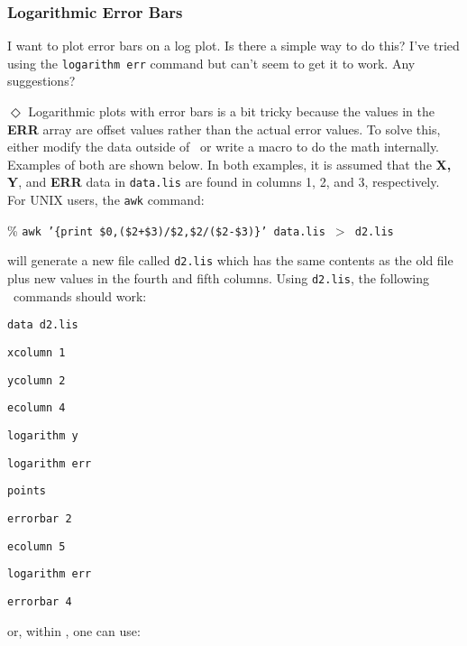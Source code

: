 \subsubsection*         {Logarithmic Error Bars}

I want to plot error bars on a log plot.
Is there a simple way to do this?
I've tried using the {\tt logarithm err} command but can't seem to get
it to work.
Any suggestions?

\indent$\Diamond$
Logarithmic plots with error bars is a bit tricky because the values in
the {\bf ERR} array are offset values rather than the actual error values.
To solve this, either modify the data outside of \wip\ or write
a macro to do the math internally.
Examples of both are shown below.
In both examples, it is assumed that the {\bf X, Y}, and {\bf ERR}
data in {\tt data.lis} are found in columns 1, 2, and 3, respectively.
For UNIX users, the {\tt awk} command:
\begin{wiplist}%
  \item [\%] {\tt awk '\{print \$0,(\$2+\$3)/\$2,\$2/(\$2-\$3)\}' data.lis $>$ d2.lis}
\end{wiplist}
will generate a new file called {\tt d2.lis} which has the same
contents as the old file plus new values in the fourth and fifth columns.
Using {\tt d2.lis}, the following \wip\ commands should work:
\begin{wiplist}%
  \item {\tt data d2.lis}
  \samepage
  \item {\tt xcolumn 1}
  \item {\tt ycolumn 2}
  \item {\tt ecolumn 4}
  \item {\tt logarithm y}
  \item {\tt logarithm err}
  \item {\tt points}
  \item {\tt errorbar 2}
  \item {\tt ecolumn 5}
  \item {\tt logarithm err}
  \item {\tt errorbar 4}
\end{wiplist}
or, within \wip, one can use:
